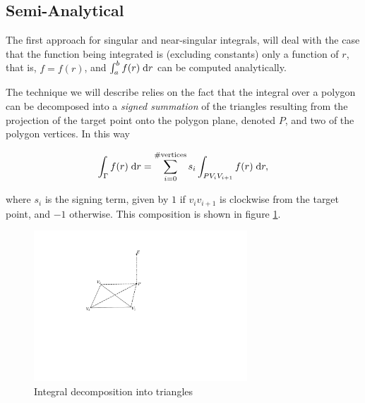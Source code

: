 
\subsection{Semi-Analytical}\label{subsubsec:semi_analytical}

The first approach for singular and near-singular integrals, will deal with the case that the function being integrated is (excluding constants) only a function of $r$, that is, $f = f(r)$, and $\int_a^{b} f(r)\;\text{d}r$ can be computed analytically.

The technique we will describe relies on the fact that the integral over a polygon can be decomposed into a \emph{signed summation} of the triangles resulting from the projection of the target point onto the polygon plane, denoted $P$, and two of the polygon vertices. In this way

\begin{equation}
	\int_\Gamma f(r)\;\text{d}r = \sum_{i=0}^{\# \text{vertices}} s_i \int_{PV_iV_{i+1}} f(r)\;\text{d}r,
\end{equation}

\noindent
where $s_i$ is the signing term, given by $1$ if $v_iv_{i+1}$ is clockwise from the target point, and $-1$ otherwise. This composition is shown in figure \ref{fig:semi_analytical_decomposition}.


\begin{figure}[ht]
\begin{center}
	\includegraphics[width=8cm]{img/SemiAnalyticalDecomposition.pdf}
	\caption{Integral decomposition into triangles}
	\label{fig:semi_analytical_decomposition}
	\end{center}
\end{figure}


